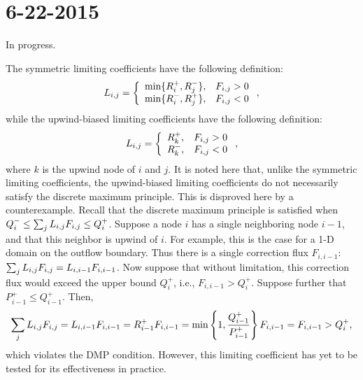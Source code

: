 \section*{6-22-2015}

\begin{enumerate}

In progress.

The symmetric limiting coefficients have the following definition:
\begin{equation}
  L_{i,j} = \left\{\begin{array}{l l}
    \min\{R_i^+,R_j^-\}, & F_{i,j} > 0 \\
    \min\{R_i^-,R_j^+\}, & F_{i,j} < 0
  \end{array}\right.,
\end{equation}
while the upwind-biased limiting coefficients have the following definition:
\begin{equation}
  L_{i,j} = \left\{\begin{array}{l l}
    R_k^+, & F_{i,j} > 0 \\
    R_k^-, & F_{i,j} < 0
  \end{array}\right.,
\end{equation}
where $k$ is the upwind node of $i$ and $j$. It is noted here that, unlike
the symmetric limiting coefficients, the upwind-biased limiting coefficients
do not necessarily satisfy the discrete maximum principle. This is disproved
here by a counterexample. Recall that the discrete maximum principle is satisfied when
$Q_i^-\le \sum_j L_{i,j} F_{i,j}\le Q_i^+$. Suppose a node $i$ has a single
neighboring node $i-1$, and that this neighbor is upwind of $i$. For example, this is
the case for a 1-D domain on the outflow boundary. Thus there is a single
correction flux $F_{i,i-1}$: $\sum_j L_{i,j} F_{i,j}=L_{i,i-1} F_{i,i-1}$. Now
suppose that without limitation, this correction flux would exceed the
upper bound $Q_i^+$, i.e., $F_{i,i-1}>Q_i^+$. Suppose further that
$P_{i-1}^+\leq Q_{i-1}^+$. Then,
\[
  \sum\limits_j L_{i,j} F_{i,j}=
  L_{i,i-1} F_{i,i-1}=
  R_{i-1}^+ F_{i,i-1}=
  \min\left\{1,\frac{Q_{i-1}^+}{P_{i-1}^+}\right\} F_{i,i-1}=
  F_{i,i-1}>
  Q_i^+,
\]
which violates the DMP condition. However, this limiting coefficient has
yet to be tested for its effectiveness in practice.


\end{enumerate}
